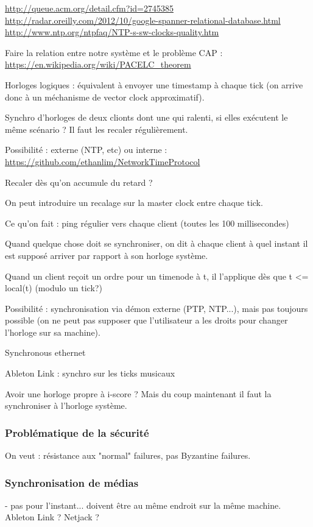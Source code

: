 \documentclass{article}
\begin{document}
\url{http://queue.acm.org/detail.cfm?id=2745385}
\url{http://radar.oreilly.com/2012/10/google-spanner-relational-database.html}
\url{http://www.ntp.org/ntpfaq/NTP-s-sw-clocks-quality.htm}

Faire la relation entre notre système et le problème CAP : \url{https://en.wikipedia.org/wiki/PACELC_theorem}

Horloges logiques : équivalent à envoyer une timestamp à chaque tick (on arrive donc à un méchanisme de vector clock approximatif). 

Synchro d'horloges de deux clionts dont une qui ralenti, si elles exécutent le même 
scénario ? Il faut les recaler régulièrement. 

Possibilité : externe (NTP, etc) ou interne : \url{https://github.com/ethanlim/NetworkTimeProtocol}

Recaler dès qu'on accumule du retard ?



On peut introduire un recalage sur la master clock entre chaque tick.

Ce qu'on fait : ping régulier vers chaque client (toutes les 100 millisecondes)

Quand quelque chose doit se synchroniser, on dit à chaque client à quel instant il est supposé arriver par rapport à son horloge système.

Quand un client reçoit un ordre pour un timenode à t, il l'applique dès que t <= local(t) (modulo un tick?)



Possibilité : synchronisation via démon externe (PTP, NTP...), mais pas toujours possible (on ne peut pas supposer que l'utilisateur a les droits pour changer l'horloge sur sa machine).

Synchronous ethernet

Ableton Link : synchro sur les ticks musicaux 

Avoir une horloge propre à i-score ? Mais du coup maintenant il faut la synchroniser à l'horloge système. 

\subsubsection{Problématique de la sécurité}
On veut : résistance aux "normal" failures, pas Byzantine failures.

\subsubsection{Synchronisation de médias}
- pas pour l'instant... doivent être au même endroit sur la même machine.
Ableton Link ? Netjack ?
\end{document}

